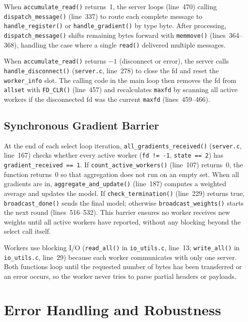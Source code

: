 \documentclass[11pt]{article}
\begin{document}
When \texttt{accumulate\_read()} returns~1, the server loops (line~470) calling
\texttt{dispatch\_message()} (line~337) to route each complete message to
\texttt{handle\_register()} or \texttt{handle\_gradient()} by type byte. After
processing, \texttt{dispatch\_message()} shifts remaining bytes forward with
\texttt{memmove()} (lines~364--368), handling the case where a single
\texttt{read()} delivered multiple messages.

When \texttt{accumulate\_read()} returns $-1$ (disconnect or error), the server
calls \texttt{handle\_disconnect()} (\texttt{server.c}, line~278) to close the
fd and reset the \texttt{worker\_info} slot. The calling code in the main loop
then removes the fd from \texttt{allset} with \texttt{FD\_CLR()} (line~457) and
recalculates \texttt{maxfd} by scanning all active workers if the disconnected
fd was the current \texttt{maxfd} (lines~459--466).

\subsection{Synchronous Gradient Barrier}

At the end of each select loop iteration, \texttt{all\_gradients\_received()}
(\texttt{server.c}, line~167) checks whether every active worker
(\texttt{fd != -1}, \texttt{state == 2}) has \texttt{gradient\_received == 1}.
If \texttt{count\_active\_workers()} (line~107)
returns~0, the function returns~0 so that aggregation does not run on an empty set. When all gradients are in,
\texttt{aggregate\_and\_update()} (line~187) computes a weighted average and
updates the model. If \texttt{check\_termination()} (line~229) returns true,
\texttt{broadcast\_done()} sends the final model; otherwise
\texttt{broadcast\_weights()} starts the next round (lines~516--532). This
barrier ensures no worker receives new weights until all active workers have
reported, without any blocking beyond the select call itself.

Workers use blocking I/O (\texttt{read\_all()} in \texttt{io\_utils.c},
line~13; \texttt{write\_all()} in \texttt{io\_utils.c}, line~29) because each
worker communicates with only one server. Both functions loop until the
requested number of bytes has been transferred or an error occurs, so the
worker never tries to parse partial headers or payloads.


\section{Error Handling and Robustness}
\end{document}
